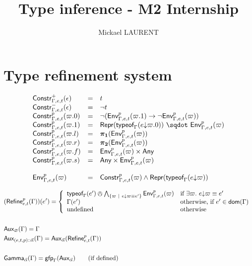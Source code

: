 \documentclass[a4paper]{article}
\title{\vspace{1.5cm}Type inference - M2 Internship}
\author{Mickael LAURENT}
\date{\vspace{-5ex}}
\theoremstyle{definition}
\begin{document}
    \maketitle

    \section{Type refinement system}

    \[
    \begin{array}{lcl}
      \typep+\epsilon{\Gamma,e,t} & = & t\\
      \typep-\epsilon{\Gamma,e,t} & = & \neg t\\
      \typep{p}{\varpi.0}{\Gamma,e,t} & = & \neg(\arrow{\Gp p{\Gamma,e,t}{(\varpi.1)}}{\neg \Gp p {\Gamma,e,t} (\varpi)})\\
      \typep{p}{\varpi.1}{\Gamma,e,t} & = & \worra{\tsrep {\tyof{\occ e{\varpi.0}}\Gamma}}{\Gp p {\Gamma,e,t} (\varpi)}\\
      \typep{p}{\varpi.l}{\Gamma,e,t} & = & \bpl{\Gp p {\Gamma,e,t} (\varpi)}\\
      \typep{p}{\varpi.r}{\Gamma,e,t} & = & \bpr{\Gp p {\Gamma,e,t} (\varpi)}\\
      \typep{p}{\varpi.f}{\Gamma,e,t} & = & \pair{\Gp p {\Gamma,e,t} (\varpi)}\Any\\
      \typep{p}{\varpi.s}{\Gamma,e,t} & = & \pair\Any{\Gp p {\Gamma,e,t} (\varpi)}\\ \\
      \Gp p {\Gamma,e,t} (\varpi) & = & \typep p \varpi {\Gamma,e,t} \land \tsrep {\tyof {\occ e \varpi} \Gamma}\\
    \end{array}
    \]

    \begin{align*}
      &(\Refine p {e,t} \Gamma)(e') = 
        \left\{\begin{array}{ll}
          \tyof {e'} \Gamma \tsand \bigwedge_{\{\varpi \alt \occ e \varpi \equiv e'\}} \Gp p {\Gamma,e,t} (\varpi) & \text{if } \exists \varpi.\ \occ e \varpi \equiv e' \\
          \Gamma(e') & \text{otherwise, if } e' \in \dom \Gamma\\
          \text{undefined} & \text{otherwise}
        \end{array}\right.\\&\\
      &\Gaux {\varnothing} \Gamma = \Gamma\\
      &\Gaux {\cons {(e,t,p)} \tenv} \Gamma = \Gaux \tenv {\Refine p {e,t} \Gamma}\\&\\
      &\Genv \tenv \Gamma=\fixpoint_\Gamma (\Gaa \tenv)\qquad \text{(if defined)}
    \end{align*}
\end{document}
